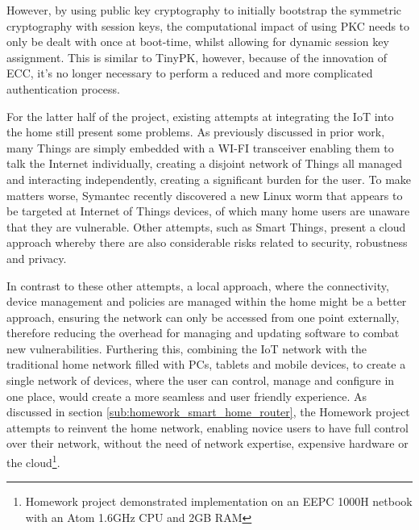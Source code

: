 \documentclass{mprop}
\begin{document}

However, by using public key cryptography to initially bootstrap the symmetric cryptography with session keys, the computational impact of using PKC needs to only be dealt with once at boot-time, whilst allowing for dynamic session key assignment. This is similar to TinyPK, however, because of the innovation of ECC, it's no longer necessary to perform a reduced and more complicated authentication process\cite{TinyPK}.

For the latter half of the project, existing attempts at integrating the IoT into the home still present some problems. As previously discussed in prior work\cite{KNoT}, many Things are simply embedded with a WI-FI transceiver enabling them to talk the Internet individually, creating a disjoint network of Things all managed and interacting independently, creating a significant burden for the user. To make matters worse, Symantec recently discovered a new Linux worm\cite{IoTWorm} that appears to be targeted at Internet of Things devices, of which many home users are unaware that they are vulnerable. Other attempts, such as Smart Things, present a cloud approach whereby there are also considerable risks related to security, robustness and privacy. 

In contrast to these other attempts, a local approach, where the connectivity, device management and policies are managed within the home might be a better approach, ensuring the network can only be accessed from one point externally, therefore reducing the overhead for managing and updating software to combat new vulnerabilities. Furthering this, combining the IoT network with the traditional home network filled with PCs, tablets and mobile devices, to create a single network of devices, where the user can control, manage and configure in one place, would create a more seamless and user friendly experience. As discussed in section \ref{sub:homework_smart_home_router}, the Homework project attempts to reinvent the home network, enabling novice users to have full control over their network, without the need of network expertise, expensive hardware or the cloud\footnote{Homework project demonstrated implementation on an EEPC 1000H netbook with an Atom 1.6GHz CPU and 2GB RAM}. 
\end{document}
